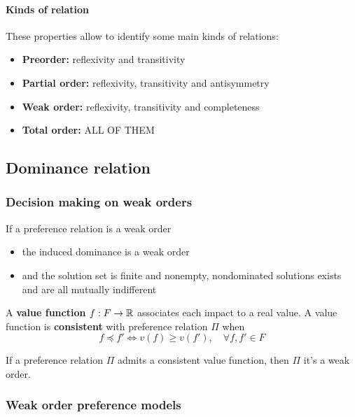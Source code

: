 \paragraph{Kinds of relation} These properties allow to identify some main kinds of relations:
\begin{itemize}
	\item \textbf{Preorder:} reflexivity and transitivity
	
	\item \textbf{Partial order:} reflexivity, transitivity and antisymmetry
	
	\item \textbf{Weak order:} reflexivity, transitivity and completeness
	
	\item \textbf{Total order:} ALL OF THEM
\end{itemize}


\subsection{Dominance relation}

\subsubsection{Decision making on weak orders}

If a preference relation is a weak order
\begin{itemize}
	\item the induced dominance is a weak order
	
	\item and the solution set is finite and nonempty, nondominated solutions exists and are all mutually indifferent
\end{itemize}

A \textbf{value function} $f: F \rightarrow \operatorname{\mathbb{R}}$ associates each impact to a real value. A value function is \textbf{consistent} with preference relation $\Pi$ when 
$$ f \preceq f' \Leftrightarrow v(f) \geq v(f'), \quad \forall f,f' \in F$$

If a preference relation $\Pi$ admits a consistent value function, then $\Pi$ it's a weak order.

\subsubsection{Weak order preference models}

